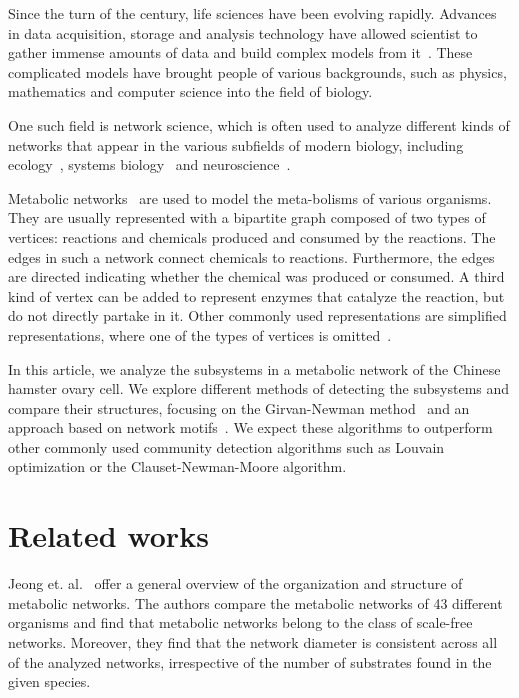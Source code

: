 Since the turn of the century, life sciences have been evolving
rapidly. Advances in data acquisition, storage and analysis technology have
allowed scientist to gather immense amounts of data and build complex models
from it~\cite{modsys}. These complicated models have brought people of various
backgrounds, such as physics, mathematics and computer science into the field
of biology.

One such field is network science, which
is often used to analyze different kinds of networks that appear in the various
subfields of modern biology, including ecology~\cite{proulx2005network}, systems
biology~\cite{barabasi2004network} and neuroscience~\cite{sporns2014contributions}.

Metabolic networks~\cite{jeong2000large} are used to model the meta-bolisms of
various organisms. They are usually represented with a bipartite graph composed
of two types of vertices: reactions and chemicals produced and consumed by the
reactions. The edges in such a network connect chemicals to
reactions. Furthermore, the edges are directed indicating whether the chemical
was produced or consumed. A third kind of vertex can be added to represent
enzymes that catalyze the reaction, but do not directly partake in
it. Other commonly used representations are simplified representations, where
one of the types of vertices is omitted~\cite{newman2010networks}.

In this article, we analyze the subsystems in a metabolic network of the Chinese
hamster ovary cell. We explore different methods of detecting the subsystems and
compare their structures, focusing on the Girvan-Newman
method~\cite{girvan2002community} and an approach based on network
motifs~\cite{benson2016higher}. We expect these algorithms to outperform other
commonly used community detection algorithms such as Louvain optimization or the
Clauset-Newman-Moore algorithm.

\section{Related works}
\label{sec:related}

Jeong et. al.~\cite{jeong2000large} offer a general overview of the organization
and structure of metabolic networks. The authors compare the metabolic networks
of 43 different organisms and find that metabolic networks belong to the class
of scale-free networks. Moreover, they find that the network diameter is
consistent across all of the analyzed networks, irrespective of the number of
substrates found in the given species.

